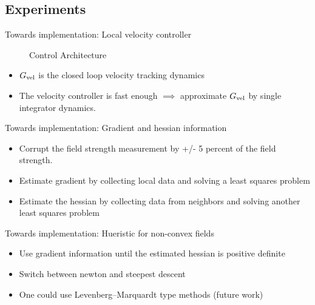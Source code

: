 \subsection{Experiments}
\begin{frame}{Towards implementation: Local velocity controller}
\begin{figure}[h!]
	
	\caption{Control Architecture}
	\label{fig:control_arch}	
\end{figure}
\begin{itemize}
	\item $G_{\textnormal{vel}}$ is the closed loop velocity tracking dynamics
	\item The velocity controller is fast enough $\implies$ approximate $G_{\textnormal{vel}}$ by single integrator dynamics.
\end{itemize}
\end{frame}
\begin{frame}{Towards implementation: Gradient and hessian information}
\begin{itemize}
	\item Corrupt the field strength measurement by +/- 5 percent of the field strength. 
	\item Estimate gradient by collecting local data and solving a least squares problem
	\item Estimate the hessian by collecting data from neighbors and solving another least squares problem
\end{itemize}
\end{frame}
\begin{frame}{Towards implementation: Hueristic for non-convex fields}
\begin{itemize}
	\item Use gradient information until the estimated hessian is positive definite
	\item Switch between newton and steepest descent 
	\item One could use Levenberg–Marquardt type methods (future work)
\end{itemize}
\end{frame}
